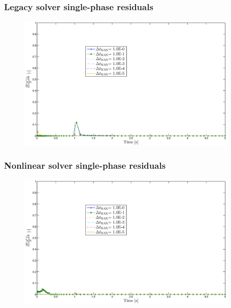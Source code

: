 \documentclass[compress,xcolor=table]{beamer}
\begin{document}
\begin{frame}
\frametitle{Legacy solver single-phase residuals}

\begin{figure}[h!t]
\centering
\includegraphics[width=0.94\textwidth]{images/cobra_single_res_v_dt.eps}
\end{figure}

\end{frame}
\begin{frame}
\frametitle{Nonlinear solver single-phase residuals}

\begin{figure}[h!t]
\centering
\includegraphics[width=0.94\textwidth]{images/nl_single_res_v_dt.eps}
\end{figure}

\end{frame}
\end{document}
